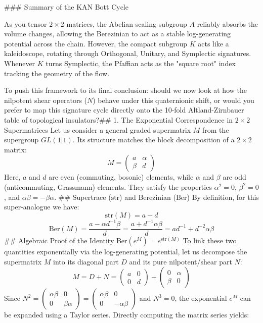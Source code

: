 ### Summary of the KAN Bott Cycle

As you tensor $2 \times 2$ matrices, the Abelian scaling subgroup $A$ reliably absorbs the volume changes, allowing the Berezinian to act as a stable log-generating potential across the chain. However, the compact subgroup $K$ acts like a kaleidoscope, rotating through Orthogonal, Unitary, and Symplectic signatures. Whenever $K$ turns Symplectic, the Pfaffian acts as the "square root" index tracking the geometry of the flow.

To push this framework to its final conclusion: should we now look at how the nilpotent shear operators ($N$) behave under this quaternionic shift, or would you prefer to map this signature cycle directly onto the 10-fold Altland-Zirnbauer table of topological insulators?## 1. The Exponential Correspondence in $2 \times 2$ Supermatrices
Let us consider a general graded supermatrix $M$ from the supergroup $GL(1\vert{}1)$. Its structure matches the block decomposition of a $2 \times 2$ matrix:
$$M = \begin{pmatrix} a & \alpha \\ \beta & d \end{pmatrix}$$ 
Here, $a$ and $d$ are even (commuting, bosonic) elements, while $\alpha$ and $\beta$ are odd (anticommuting, Grassmann) elements. They satisfy the properties $\alpha^2 = 0$, $\beta^2 = 0$, and $\alpha\beta = -\beta\alpha$.
## Supertrace ($\text{str}$) and Berezinian ($\text{Ber}$)
By definition, for this super-analogue we have:
$$\text{str}(M) = a - d$$ 
$$\text{Ber}(M) = \frac{a - \alpha d^{-1} \beta}{d} = \frac{a + d^{-1}\alpha\beta}{d} = a d^{-1} + d^{-2}\alpha\beta$$ 
## Algebraic Proof of the Identity $\text{Ber}(e^M) = e^{\text{str}(M)}$
To link these two quantities exponentially via the log-generating potential, let us decompose the supermatrix $M$ into its diagonal part $D$ and its pure nilpotent/shear part $N$:
$$M = D + N = \begin{pmatrix} a & 0 \\ 0 & d \end{pmatrix} + \begin{pmatrix} 0 & \alpha \\ \beta & 0 \end{pmatrix}$$ 
Since $N^2 = \begin{pmatrix} \alpha\beta & 0 \\ 0 & \beta\alpha \end{pmatrix} = \begin{pmatrix} \alpha\beta & 0 \\ 0 & -\alpha\beta \end{pmatrix}$ and $N^3 = 0$, the exponential $e^M$ can be expanded using a Taylor series. Directly computing the matrix series yields:

